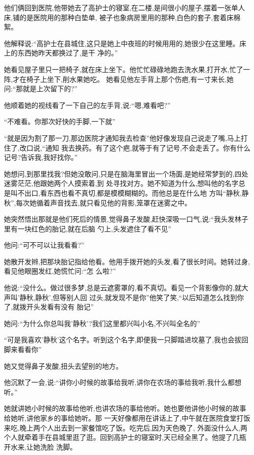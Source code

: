 ﻿\documentclass[12pt]{article}
\begin{document}
他们俩回到医院,他带她去了高护士的寝室,在二楼,是间很小的屋子,摆着一张单人床,铺的是医院用的那种白垫单,
被子也象病房里用的那种,白色的套子,套着床棉絮。

他解释说:``高护士在县城住,这只是她上中夜班的时候用用的,她很少在这里睡。床上的东西她昨天都换过了,是干
净的。''

她看见屋子里只一把椅子,就在床上坐下。他忙忙碌碌地跑去洗水果,打开水,忙了一阵,才在椅子上坐下,削水果她吃。
她看见他左手背上那个伤疤,有一寸来长,她问:``那就是\myrule 上次\myrule 留下的?''

他顺着她的视线看了一下自己的左手背,说:``嗯,难看吧?''

``不难看。你那次好快的手脚,一下就\myrule ''

``就是因为割了那一刀,那边医院才通知我去检查\myrule ''他好像发现自己说走了嘴,马上打住了,改口说,``通知
我去换药。有了这个疤,就等于有了记号,不会走丢了。你有什么记号?告诉我,我\myrule 好找你。''

她想问,到那里找我?但她没敢问,只是在脑海里冒出一个场面,是她经常梦到的,四处迷雾茫茫,他跟她两个人摸索着,到
处寻找对方。她不知道为什么,想叫他的名字总是叫不出口,看东西也看不真切,都是模模糊糊的。而他总是在什么地
方叫``静秋,静秋'',每次她循着声音找去,就只看见他的背影,笼罩在迷雾之中。

她突然悟出那就是他们死后的情景,觉得鼻子发酸,赶快深吸一口气,说:``我头发林子里有一块红色的胎记,就在后脑
勺上,头发遮住了看不见\myrule ''

他问:``可不可以让我看看?''

她散开发辫,把那块胎记指给他看。他用手拨开她的头发,看了很长时间。她转过身,看见他眼圈发红,她慌忙问:``怎
么啦?''

他说:``没什么。做过很多梦,总是云遮雾罩的,看不真切。看见一个背影像你的,就大声叫'静秋,静秋',但等别人回
过头,就发现\myrule 不是你\myrule ''他笑了笑,``以后知道怎么找到你了,就\myrule 拨开头发看\myrule 有没有
胎记\myrule ''

她问:``为什么你总叫我'静秋'?我们这里都兴叫小名,不兴叫全名的\myrule ''

``可是我喜欢'静秋'这个名字。听到这个名字,即便我一只脚踏进坟墓了,我也会拔回脚来看看你\myrule ''

她又觉得鼻子发酸,扭头去望别的地方。

他沉默了一会,说:``讲你小时候的故事给我听,讲你在农场的事给我听\myrule ,我什么都想听。''

她就讲她小时候的故事给他听,也讲农场的事给他听。她也要他讲他小时候的故事给她听,讲他家乡的事给她听。那
一天好像都用在讲话上了,中午就在医院食堂打饭来吃,晚上两个人出去到一家餐馆吃了饭。吃完后,因为天色晚了,
外面没什么人,两个人就牵着手在县城里逛了逛。回到高护士的寝室时,天已经全黑了。他提了几瓶开水来,让她洗脸
洗脚。
\end{document}
